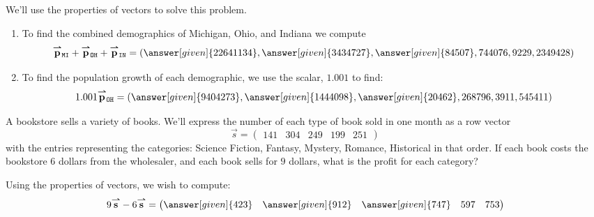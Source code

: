 \documentclass{ximera}
\begin{document}
\begin{example}
\begin{explanation}
  We'll use the properties of vectors to solve this problem.
  \begin{enumerate}
  \item To find the combined demographics of Michigan, Ohio, and
    Indiana we compute
    \[
    \vec{p}_{\texttt{MI}} + \vec{p}_{\texttt{OH}} + \vec{p}_{\texttt{IN}} = \left(\answer[given]{22641134},\answer[given]{3434727},\answer[given]{84507},744076,9229,2349428\right)
    \]
  \item To find the population growth of each demographic, we use the scalar, $1.001$ to find:
    \[
    1.001 \vec{p}_{\texttt{OH}} =\left(\answer[given]{9404273},\answer[given]{1444098},\answer[given]{20462},268796,3911,545411 \right)
    \]
  \end{enumerate}
\end{explanation}
\end{example}



\begin{example}
  A bookstore sells a variety of books. We'll express the number of
  each type of book sold in one month as a row vector
  \[
  \vec{s} = \begin{pmatrix}141 & 304 & 249 & 199 & 251 \end{pmatrix}
  \]
  with the entries representing the categories: Science Fiction,
  Fantasy, Mystery, Romance, Historical in that order.  If each book
  costs the bookstore $6$ dollars from the wholesaler, and each book sells
  for $9$ dollars, what is the profit for each category?
  \begin{explanation}
    Using the properties of vectors, we wish to compute:
    \[
    9\vec{s}-6\vec{s} = \begin{pmatrix} \answer[given]{423} & \answer[given]{912} & \answer[given]{747} & 597 & 753 \end{pmatrix}
    \]
  \end{explanation}
\end{example}
\end{document}
